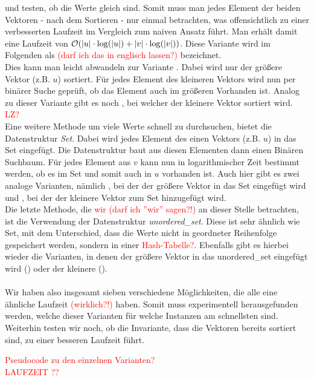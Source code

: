 und testen, ob die Werte gleich sind. Somit muss man jedes Element der beiden Vektoren - nach dem Sortieren - 
nur einmal betrachten, was offensichtlich zu einer verbesserten Laufzeit im Vergleich zum \glqq naiven\grqq{}
Ansatz führt. Man erhält damit eine Laufzeit von $\mathcal{O}(|u|\cdot \log (|u|)  + |v|\cdot\log(|v|))$. 
Diese Variante wird im Folgenden als \SorSor \textcolor{red}{(darf ich das in
englisch lassen?)} bezeichnet.
\\
Dies kann man leicht abwandeln zur Variante \SorSea. Dabei wird nur der größere Vektor (z.B. $u$)
sortiert.
Für jedes Element des kleineren Vektors wird nun per binärer Suche geprüft, ob das Element auch im 
größeren Vorhanden ist. Analog zu dieser Variante gibt es noch \SeaSor, bei welcher 
der kleinere Vektor sortiert wird. \textcolor{red}{LZ?}
\\
Eine weitere Methode um  viele Werte schnell zu durchsuchen, bietet die Datenstruktur \textit{Set}.
Dabei wird jedes Element des einen Vektors (z.B. $u$) in das Set eingefügt. Die Datenstruktur
baut aus diesen Elementen dann einen Binären Suchbaum. Für jedes Element aus $v$ kann nun in logarithmischer
Zeit bestimmt werden, ob es im Set und somit auch in $u$ vorhanden ist. Auch hier gibt es zwei
analoge Varianten, nämlich \SetSea, bei der der größere Vektor in das Set eingefügt wird
und \SeaSet, bei der der kleinere Vektor zum Set hinzugefügt wird.
\\
Die letzte Methode, die \textcolor{red}{wir (darf ich ''wir'' sagen?!)} an dieser Stelle betrachten,
ist die Verwendung der Datenstruktur \textit{unordered\_set}. Diese ist sehr ähnlich wie Set, mit
dem Unterschied, dass die Werte nicht in geordneter Reihenfolge gespeichert werden, sondern
in einer \textcolor{red}{Hash-Tabelle?}. Ebenfalls gibt es hierbei wieder die Varianten, 
in denen der größere Vektor in das unordered\_set eingefügt wird (\USetSea) 
oder der kleinere (\SeaUSet).
\\
\\
Wir haben also insgesamt sieben verschiedene Möglichkeiten, die alle eine ähnliche Laufzeit \textcolor{red}{(wirklich?!)}
haben. Somit muss experimentell herausgefunden werden, welche dieser Varianten für welche Instanzen am
schnellsten sind. Weiterhin testen wir noch, ob die Invariante, dass die Vektoren bereits 
sortiert sind, zu einer besseren Laufzeit führt.


\textcolor{red}{Pseudocode zu den einzelnen Varianten?}\\
\textcolor{red}{LAUFZEIT ??}



